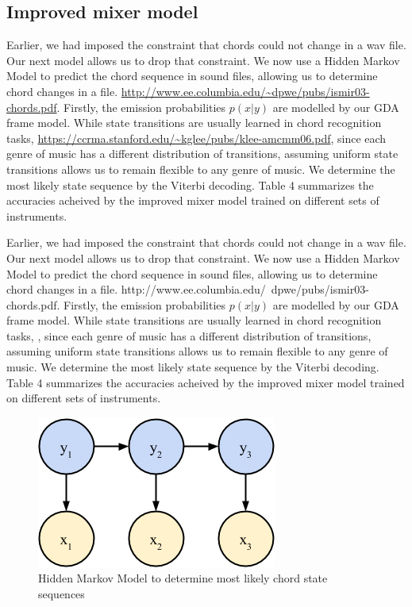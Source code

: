 \documentclass{article}
\begin{document}
\subsection{Improved mixer model}
Earlier, we had imposed the constraint that chords could not change in a wav file. Our next model allows us to drop that constraint. We now use a Hidden Markov Model to predict the chord sequence in sound files, allowing us to determine chord changes in a file. \url{http://www.ee.columbia.edu/~dpwe/pubs/ismir03-chords.pdf}. Firstly, the emission probabilities $p(x|y)$ are modelled by our GDA frame model. While state transitions are usually learned in chord recognition tasks, \url{https://ccrma.stanford.edu/~kglee/pubs/klee-amcmm06.pdf}, since each genre of music has a different distribution of transitions, assuming uniform state transitions allows us to remain flexible to any genre of music. We determine the most likely state sequence by the Viterbi decoding. Table 4 summarizes the accuracies acheived by the improved mixer model trained on different sets of instruments.

Earlier, we had imposed the constraint that chords could not change in a wav file. Our next model allows us to drop that constraint. We now use a Hidden Markov Model to predict the chord sequence in sound files, allowing us to determine chord changes in a file. http://www.ee.columbia.edu/~dpwe/pubs/ismir03-chords.pdf. Firstly, the emission probabilities $p(x|y)$ are modelled by our GDA frame model. While state transitions are usually learned in chord recognition tasks, \cite{lee}, since each genre of music has a different distribution of transitions, assuming uniform state transitions allows us to remain flexible to any genre of music. We determine the most likely state sequence by the Viterbi decoding. Table 4 summarizes the accuracies acheived by the improved mixer model trained on different sets of instruments.

\begin{figure}[ht]
\vskip 0.2in
\begin{center}
\centerline{\includegraphics[width=\columnwidth]{hmm}}
\caption{Hidden Markov Model to determine most likely chord state sequences}
\label{icml-historical}
\end{center}
\vskip -0.2in
\end{figure}
\end{document}
